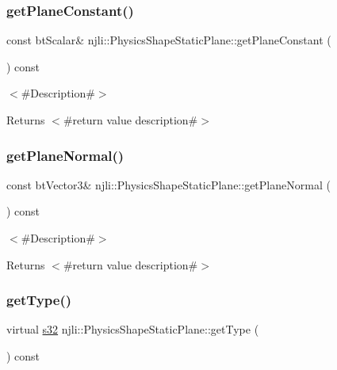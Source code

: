 \subsubsection{\texorpdfstring{get\+Plane\+Constant()}{getPlaneConstant()}}
{\footnotesize\ttfamily const bt\+Scalar\& njli\+::\+Physics\+Shape\+Static\+Plane\+::get\+Plane\+Constant (\begin{DoxyParamCaption}{ }\end{DoxyParamCaption}) const}

$<$\#\+Description\#$>$

\begin{DoxyReturn}{Returns}
$<$\#return value description\#$>$ 
\end{DoxyReturn}
\mbox{\label{classnjli_1_1_physics_shape_static_plane_af5e3847eaaa60ba5f46336fef66220b6}} 
\subsubsection{\texorpdfstring{get\+Plane\+Normal()}{getPlaneNormal()}}
{\footnotesize\ttfamily const bt\+Vector3\& njli\+::\+Physics\+Shape\+Static\+Plane\+::get\+Plane\+Normal (\begin{DoxyParamCaption}{ }\end{DoxyParamCaption}) const}

$<$\#\+Description\#$>$

\begin{DoxyReturn}{Returns}
$<$\#return value description\#$>$ 
\end{DoxyReturn}
\mbox{\label{classnjli_1_1_physics_shape_static_plane_a2ca386d4ea821161f51aedf153581c16}} 
\subsubsection{\texorpdfstring{get\+Type()}{getType()}}
{\footnotesize\ttfamily virtual \mbox{\hyperlink{_util_8h_aa62c75d314a0d1f37f79c4b73b2292e2}{s32}} njli\+::\+Physics\+Shape\+Static\+Plane\+::get\+Type (\begin{DoxyParamCaption}{ }\end{DoxyParamCaption}) const\hspace{0.3cm}{\ttfamily [virtual]}}

